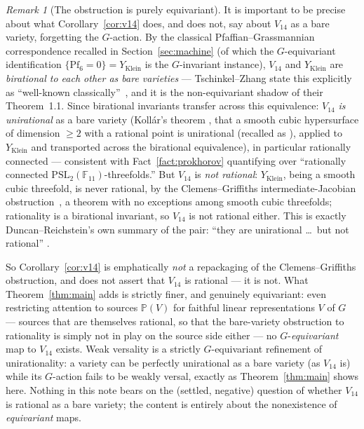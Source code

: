 \documentclass[11pt]{article}
\theoremstyle{plain}
\theoremstyle{definition}
\theoremstyle{remark}
\newtheorem{remark}[theorem]{Remark}
\newcommand{\PSL}{\mathrm{PSL}_2(\mathbb{F}_{11})}
\newcommand{\PP}{\mathbb P}
\begin{document}
\begin{remark}[The obstruction is purely equivariant]
\label{rem:bare}
It is important to be precise about what Corollary~\ref{cor:v14} does,
and does not, say about $V_{14}$ as a bare variety, forgetting the
$G$-action. By the classical Pfaffian--Grassmannian correspondence
recalled in Section~\ref{sec:machine} (of which the $G$-equivariant
identification $\{\mathrm{Pf}_6=0\}=Y_{\mathrm{Klein}}$ is the
$G$-invariant instance), $V_{14}$ and $Y_{\mathrm{Klein}}$ are
\emph{birational to each other as bare varieties} --- Tschinkel--Zhang
state this explicitly as ``well-known classically''~\cite{TZ}, and it
is the non-equivariant shadow of their Theorem~1.1. Since birational
invariants transfer across this equivalence: $V_{14}$ \emph{is
unirational} as a bare variety (Kollár's theorem \cite{Kollar}, that a
smooth cubic hypersurface of dimension $\ge 2$ with a rational point is
unirational (recalled as \cite[Thm.\ 10.3]{DR}), applied to $Y_{\mathrm
{Klein}}$ and transported across the birational equivalence), in
particular rationally connected
--- consistent with Fact~\ref{fact:prokhorov} quantifying over
``rationally connected $\PSL$-threefolds.'' But $V_{14}$ is \emph{not
rational}: $Y_{\mathrm{Klein}}$, being a smooth cubic threefold, is
never rational, by the Clemens--Griffiths intermediate-Jacobian
obstruction~\cite{CG}, a theorem with no exceptions among smooth cubic
threefolds; rationality is a birational invariant, so $V_{14}$ is not
rational either. This is exactly Duncan--Reichstein's own summary of
the pair: ``they are unirational \dots\ but not rational''
\cite[Remark~10.10]{DR}.

So Corollary~\ref{cor:v14} is emphatically \emph{not} a repackaging of
the Clemens--Griffiths obstruction, and does not assert that $V_{14}$
is rational --- it is not. What Theorem~\ref{thm:main} adds is strictly
finer, and genuinely equivariant: even restricting attention to sources
$\PP(V)$ for faithful linear representations $V$ of $G$ --- sources
that are themselves rational, so that the bare-variety obstruction to
rationality is simply not in play on the source side either --- no
$G$-\emph{equivariant} map to $V_{14}$ exists. Weak versality is a
strictly $G$-equivariant refinement of unirationality: a variety can be
perfectly unirational as a bare variety (as $V_{14}$ is) while its
$G$-action fails to be weakly versal, exactly as Theorem~\ref{thm:main}
shows here. Nothing in this note bears on the (settled, negative)
question of whether $V_{14}$ is rational as a bare variety; the content
is entirely about the nonexistence of \emph{equivariant} maps.
\end{remark}
\end{document}
